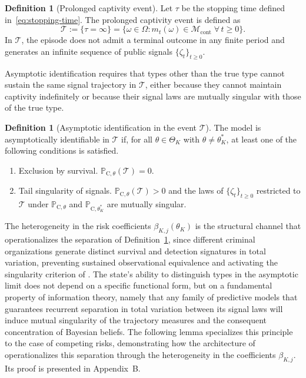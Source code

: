 \documentclass[review,authoryear,12pt]{elsarticle}
\theoremstyle{plain}
\theoremstyle{definition}
\newtheorem{definition}[theorem]{Definition}
\newcommand{\ProbC}[1]{\mathbb{P}_{\mathrm{C},#1}}
\newcommand{\ThetaK}{\Theta_K}
\newcommand{\1}{\mathbf{1}}
\begin{document}
\begin{definition}[Prolonged captivity event]\label{def:event-T-long}
Let $\tau$ be the stopping time defined in~\eqref{eq:stopping-time}. The prolonged captivity event is defined as
\[
\mathcal{T}:=\{\tau=\infty\}=\bigl\{\omega\in\Omega:m_t(\omega)\in\mathcal{M}_{\mathrm{cont}}\;\forall\,t\ge 0\bigr\}.
\]
In $\mathcal{T}$, the episode does not admit a terminal outcome in any finite period and generates an infinite sequence of public signals $\{\zeta_t\}_{t\ge 0}$.
\end{definition}

Asymptotic identification requires that types other than the true type cannot sustain the same signal trajectory in $\mathcal{T}$, either because they cannot maintain captivity indefinitely or because their signal laws are mutually singular with those of the true type.

\begin{definition}[Asymptotic identification in the event $\mathcal{T}$]\label{def:asymptotic-id}
The model is asymptotically identifiable in $\mathcal{T}$ if, for all $\theta\in\ThetaK$ with $\theta\neq\theta_K^\ast$, at least one of the following conditions is satisfied.
\begin{enumerate}
  \item[\textup{(a)}] Exclusion by survival. $\ProbC{\theta}(\mathcal{T})=0$.
  \item[\textup{(b)}] Tail singularity of signals. $\ProbC{\theta}(\mathcal{T})>0$ and the laws of $\{\zeta_t\}_{t\ge 0}$ restricted to $\mathcal{T}$ under $\ProbC{\theta}$ and $\ProbC{\theta_K^\ast}$ are mutually singular.
\end{enumerate}
\end{definition}

The heterogeneity in the risk coefficients $\beta_{K,j}(\theta_K)$ is the structural channel that operationalizes the separation of Definition~\ref{def:asymptotic-id}, since different criminal organizations generate distinct survival and detection signatures in total variation, preventing sustained observational equivalence and activating the singularity criterion of \citet{Kakutani1948}. The state's ability to distinguish types in the asymptotic limit does not depend on a specific functional form, but on a fundamental property of information theory, namely that any family of predictive models that guarantees recurrent separation in total variation between its signal laws will induce mutual singularity of the trajectory measures and the consequent concentration of Bayesian beliefs. The following lemma specializes this principle to the case of competing risks, demonstrating how the architecture of \citet{Cox1972} operationalizes this separation through the heterogeneity in the coefficients $\beta_{K,j}$. Its proof is presented in Appendix~B.
\end{document}
